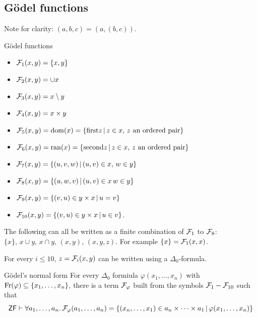 \documentclass{article}
\begin{document}
\subsection{G\"odel functions}
Note for clarity: $(a,b,c) = (a,(b,c))$.
\begin{fancydefine}{G\"odel functions}\hspace{0.1cm}
    \begin{itemize}
        \item $\mathcal{F}_{1}(x,y) = \{x,y\}$
        \item $\mathcal{F}_{2}(x,y) = \cup x$
        \item $\mathcal{F}_{3}(x,y) = x \setminus y$
        \item $\mathcal{F}_{4}(x,y) = x \times y$
        \item $\mathcal{F}_{5}(x,y) = \operatorname{dom}(x) = \{ \text{first} z \, | \, z \in x, \, z \text{ an ordered pair} \}$
        \item $\mathcal{F}_{6}(x,y) = \operatorname{ran}(x) = \{ \text{second} z \, | \, z \in x, \, z \text{ an ordered pair} \}$
        \item $\mathcal{F}_{7}(x,y) = \{(u,v,w) \, | \, (u,v) \in x, \, w \in y\}$
        \item $\mathcal{F}_{8}(x,y) = \{(u,w,v) \, | \, (u,v) \in x \, w \in y\}$
        \item $\mathcal{F}_{9}(x,y) = \{ (v,u) \in y \times x \, | \, u=v\}$
        \item $\mathcal{F}_{10}(x,y) = \{ (v,u) \in y \times x \, | \, u \in v\}$.
    \end{itemize}
\end{fancydefine}
\begin{fancyprop}{}
    The following can all be written as a finite combination of $\mathcal{F}_{1}$ to $\mathcal{F}_{8}$: $\{x\}, \, x \cup y, \, x \cap y, \, (x,y), \, (x,y,z).$ For example $\{x\} = \mathcal{F}_{1}(x,x)$.
\end{fancyprop}
\begin{fancyprop}{}
    For every $i \leq 10$, $z = \mathcal{F}_{i}(x,y)$ can be written using a $\Delta_{0}$-formula.
\end{fancyprop}
\begin{fancylem}{G\"odel's normal form}
    For every $\Delta_{0}$ formiula $\varphi(x_{1},\dots, x_{n})$ with $\operatorname{Fr}(\varphi) \subseteq \{x_{1},\dots, x_{n}\}$, there is a term $\mathcal{F}_{\varphi}$ built from the symbols $\mathcal{F}_{1} - \mathcal{F}_{10}$ such that \[ \mathsf{ZF} \vdash \forall a_{1}, \dots, a_{n}.\, \mathcal{F}_{\varphi}(a_{1}, \dots, a_{n})=\{(x_{n},\dots, x_{1}) \in a_{n}\times \dots \times a_{1} \, | \, \varphi(x_{1},\dots,x_{n})\}\]
\end{fancylem}
\end{document}
